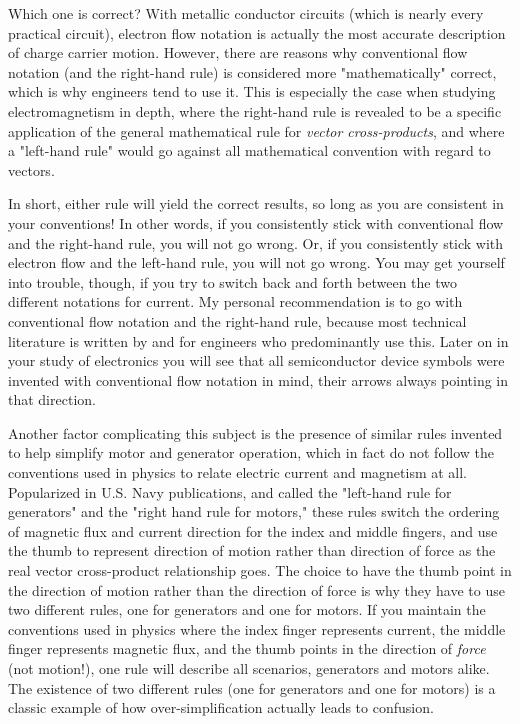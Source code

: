 Which one is correct?  With metallic conductor circuits (which is nearly every practical circuit), electron flow notation is actually the most accurate description of charge carrier motion.  However, there are reasons why conventional flow notation (and the right-hand rule) is considered more "mathematically" correct, which is why engineers tend to use it.  This is especially the case when studying electromagnetism in depth, where the right-hand rule is revealed to be a specific application of the general mathematical rule for {\it vector cross-products}, and where a "left-hand rule" would go against all mathematical convention with regard to vectors.

In short, either rule will yield the correct results, so long as you are consistent in your conventions!  In other words, if you consistently stick with conventional flow and the right-hand rule, you will not go wrong.  Or, if you consistently stick with electron flow and the left-hand rule, you will not go wrong.  You may get yourself into trouble, though, if you try to switch back and forth between the two different notations for current.  My personal recommendation is to go with conventional flow notation and the right-hand rule, because most technical literature is written by and for engineers who predominantly use this.  Later on in your study of electronics you will see that all semiconductor device symbols were invented with conventional flow notation in mind, their arrows always pointing in that direction.

Another factor complicating this subject is the presence of similar rules invented to help simplify motor and generator operation, which in fact do not follow the conventions used in physics to relate electric current and magnetism at all.  Popularized in U.S. Navy publications, and called the "left-hand rule for generators" and the "right hand rule for motors," these rules switch the ordering of magnetic flux and current direction for the index and middle fingers, and use the thumb to represent direction of motion rather than direction of force as the real vector cross-product relationship goes.  The choice to have the thumb point in the direction of motion rather than the direction of force is why they have to use two different rules, one for generators and one for motors.  If you maintain the conventions used in physics where the index finger represents current, the middle finger represents magnetic flux, and the thumb points in the direction of {\it force} (not motion!), one rule will describe all scenarios, generators and motors alike.  The existence of two different rules (one for generators and one for motors) is a classic example of how over-simplification actually leads to confusion.

